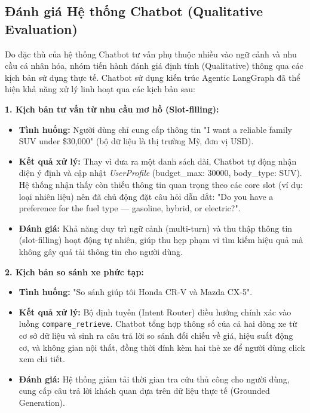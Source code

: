 
\subsection{Đánh giá Hệ thống Chatbot (Qualitative Evaluation)}
Do đặc thù của hệ thống Chatbot tư vấn phụ thuộc nhiều vào ngữ cảnh và nhu cầu cá nhân hóa, nhóm tiến hành đánh giá định tính (Qualitative) thông qua các kịch bản sử dụng thực tế. Chatbot sử dụng kiến trúc Agentic LangGraph đã thể hiện khả năng xử lý linh hoạt qua các kịch bản sau:

\textbf{1. Kịch bản tư vấn từ nhu cầu mơ hồ (Slot-filling):}
\begin{itemize}
    \item \textbf{Tình huống:} Người dùng chỉ cung cấp thông tin "I want a reliable family SUV under \$30,000" (bộ dữ liệu là thị trường Mỹ, đơn vị USD).
    \item \textbf{Kết quả xử lý:} Thay vì đưa ra một danh sách dài, Chatbot tự động nhận diện ý định và cập nhật \textit{UserProfile} (budget\_max: 30000, body\_type: SUV). Hệ thống nhận thấy còn thiếu thông tin quan trọng theo các core slot (ví dụ: loại nhiên liệu) nên đã chủ động đặt câu hỏi dẫn dắt: "Do you have a preference for the fuel type — gasoline, hybrid, or electric?".
    \item \textbf{Đánh giá:} Khả năng duy trì ngữ cảnh (multi-turn) và thu thập thông tin (slot-filling) hoạt động tự nhiên, giúp thu hẹp phạm vi tìm kiếm hiệu quả mà không gây quá tải thông tin cho người dùng.
\end{itemize}

\textbf{2. Kịch bản so sánh xe phức tạp:}
\begin{itemize}
    \item \textbf{Tình huống:} "So sánh giúp tôi Honda CR-V và Mazda CX-5".
    \item \textbf{Kết quả xử lý:} Bộ định tuyến (Intent Router) điều hướng chính xác vào luồng \texttt{compare\_retrieve}. Chatbot tổng hợp thông số của cả hai dòng xe từ cơ sở dữ liệu và sinh ra câu trả lời so sánh đối chiếu về giá, hiệu suất động cơ, và không gian nội thất, đồng thời đính kèm hai thẻ xe để người dùng click xem chi tiết.
    \item \textbf{Đánh giá:} Hệ thống giảm tải thời gian tra cứu thủ công cho người dùng, cung cấp câu trả lời khách quan dựa trên dữ liệu thực tế (Grounded Generation).
\end{itemize}

